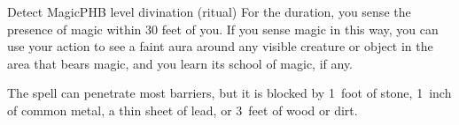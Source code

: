 \begin{spell}{Detect Magic}{PHB}{ level divination (ritual)}
{
}
For the duration, you sense the presence of magic
within 30 feet of you. If you sense magic in this way, you
can use your action to see a faint aura around any visible
creature or object in the area that bears magic, and you
learn its school of magic, if any.

The spell can penetrate most barriers, but it is blocked
by 1~foot of stone, 1~inch of common metal, a thin sheet
of lead, or 3~feet of wood or dirt.
\end{spell}